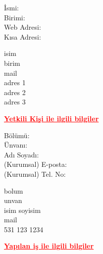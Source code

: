 \documentclass[12pt]{article}
\begin{document}
\begin{minipage}[t]{.3\textwidth}
  \begin{flushright}
      İsmi: \\
      Birimi: \\
      Web Adresi: \\
      Kısa Adresi:
  \end{flushright}
\end{minipage}%
\hspace{0.5cm}
\begin{minipage}[t]{.7\textwidth}
  isim \\
  birim \\
  mail \\
  adres 1 \\
  adres 2 \\
  adres 3
\end{minipage}

\newpage
    {\centering
  \textcolor{red}{\bfseries \ul{Yetkili Kişi ile ilgili bilgiler}}
  \\[1\baselineskip]
  \par}

\begin{minipage}[t]{.3\textwidth}
  \begin{flushright}
      Bölümü: \\
      Ünvanı: \\
      Adı Soyadı: \\
      (Kurumsal) E-posta: \\
      (Kurumsal) Tel. No:
  \end{flushright}
\end{minipage}%
\hspace{0.5cm}
\begin{minipage}[t]{.7\textwidth}
  bolum \\
  unvan \\
  isim soyisim \\
  mail \\
  531 123 1234 \\[2\baselineskip]
\end{minipage}

{\centering
  \textcolor{red}{\bfseries \ul{Yapılan i\c{s} ile ilgili bilgiler}}
  \\[1\baselineskip]
  \par}
\end{document}
